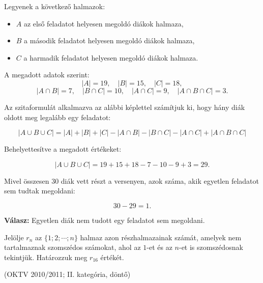 \begin{solution}
	Legyenek a következő halmazok: 
	\begin{itemize}
		\item $A$ az első feladatot helyesen megoldó diákok halmaza, 
		\item $B$ a második feladatot helyesen megoldó diákok halmaza, 
		\item $C$ a harmadik feladatot helyesen megoldó diákok halmaza. 
	\end{itemize}
	A megadott adatok szerint: 
	\[
	|A|=19,\quad|B|=15,\quad|C|=18,
	\]
	\[
	|A\cap B|=7,\quad|B\cap C|=10,\quad|A\cap C|=9,\quad|A\cap B\cap C|=3.
	\]
	
	Az szitaformulát alkalmazva az alábbi képlettel számítjuk ki, hogy
	hány diák oldott meg legalább egy feladatot:
	
	\[
	|A\cup B\cup C|=|A|+|B|+|C|-|A\cap B|-|B\cap C|-|A\cap C|+|A\cap B\cap C|
	\]
	
	Behelyettesítve a megadott értékeket:
	
	\[
	|A\cup B\cup C|=19+15+18-7-10-9+3=29.
	\]
	
	Mivel összesen $30$ diák vett részt a versenyen, azok száma, akik
	egyetlen feladatot sem tudtak megoldani:
	
	\[
	30-29=1.
	\]
	
	\textbf{Válasz:} Egyetlen diák nem tudott egy feladatot sem megoldani. 
\end{solution}
\begin{extraproblem}
	Jelölje $r_{n}$ az $\{1;2;\cdots;n\}$ halmaz azon részhalmazainak
	számát, amelyek nem tartalmaznak szomszédos számokat, ahol az $1$-et
	és az $n$-et is szomszédosnak tekintjük. Határozzuk meg $r_{16}$
	értékét.
	
	(OKTV 2010/2011; II. kategória, döntő) 
\end{extraproblem}
